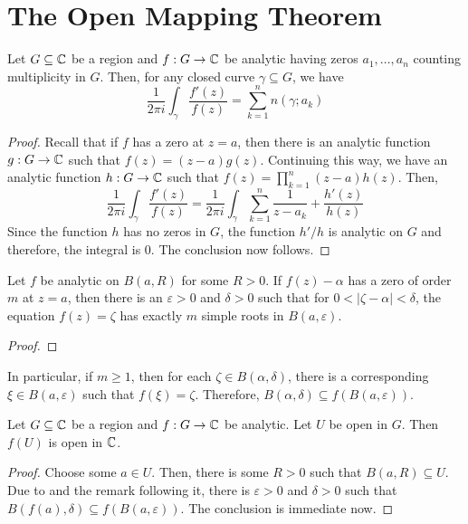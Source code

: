 \section{The Open Mapping Theorem}

\begin{theorem}
    Let $G\subseteq\mathbb{C}$ be a region and $f: G\to\mathbb{C}$ be analytic having zeros $a_1,\ldots,a_n$ counting multiplicity in $G$. Then, for any closed curve $\gamma\subseteq G$, we have
    \begin{equation*}
        \frac{1}{2\pi i}\int_\gamma\frac{f'(z)}{f(z)} = \sum_{k = 1}^n n(\gamma;a_k)
    \end{equation*}
\end{theorem}
\begin{proof}
    Recall that if $f$ has a zero at $z = a$, then there is an analytic function $g: G\to\mathbb{C}$ such that $f(z) = (z - a)g(z)$. Continuing this way, we have an analytic function $h: G\to\mathbb{C}$ such that $f(z) = \prod_{k = 1}^n (z - a) h(z)$. Then, 
    \begin{equation*}
        \frac{1}{2\pi i}\int_{\gamma}\frac{f'(z)}{f(z)} = \frac{1}{2\pi i}\int_{\gamma}\sum_{k = 1}^n\frac{1}{z - a_k} + \frac{h'(z)}{h(z)}
    \end{equation*}
    Since the function $h$ has no zeros in $G$, the function $h'/h$ is analytic on $G$ and therefore, the integral is $0$. The conclusion now follows.
\end{proof}

\begin{lemma}
    Let $f$ be analytic on $B(a,R)$ for some $R > 0$. If $f(z) - \alpha$ has a zero of order $m$ at $z = a$, then there is an $\varepsilon > 0$ and $\delta > 0$ such that for $0 < |\zeta - \alpha| < \delta$, the equation $f(z) = \zeta$ has exactly $m$ simple roots in $B(a,\varepsilon)$.
\end{lemma}
\begin{proof}
\end{proof}

In particular, if $m\ge 1$, then for each $\zeta\in B(\alpha,\delta)$, there is a corresponding $\xi\in B(a,\varepsilon)$ such that $f(\xi) = \zeta$. Therefore, $B(\alpha,\delta)\subseteq f(B(a,\varepsilon))$. 

\begin{theorem}
    Let $G\subseteq\mathbb{C}$ be a region and $f: G\to\mathbb{C}$ be analytic. Let $U$ be open in $G$. Then $f(U)$ is open in $\mathbb{C}$.
\end{theorem}
\begin{proof}
    Choose some $a\in U$. Then, there is some $R > 0$ such that $B(a,R)\subseteq U$. Due to  and the remark following it, there is $\varepsilon > 0$ and $\delta > 0$ such that $B(f(a),\delta)\subseteq f(B(a,\varepsilon))$. The conclusion is immediate now.
\end{proof}

